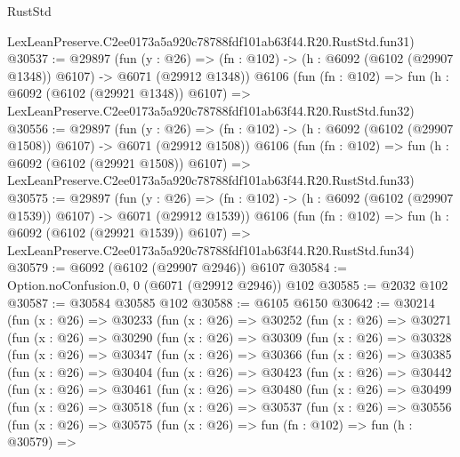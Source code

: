 \begin{lexlean}{RustStd}
\begin{coremodule}
    LexLeanPreserve.C2ee0173a5a920c78788fdf101ab63f44.R20.RustStd.fun31)
@30537 := @29897
    (fun (y : @26) =>
    (fn : @102) -> (h : @6092 (@6102 (@29907 @1348)) @6107) -> @6071 (@29912 @1348))
    @6106
    (fun (fn : @102) =>
    fun (h : @6092 (@6102 (@29921 @1348)) @6107) =>
    LexLeanPreserve.C2ee0173a5a920c78788fdf101ab63f44.R20.RustStd.fun32)
@30556 := @29897
    (fun (y : @26) =>
    (fn : @102) -> (h : @6092 (@6102 (@29907 @1508)) @6107) -> @6071 (@29912 @1508))
    @6106
    (fun (fn : @102) =>
    fun (h : @6092 (@6102 (@29921 @1508)) @6107) =>
    LexLeanPreserve.C2ee0173a5a920c78788fdf101ab63f44.R20.RustStd.fun33)
@30575 := @29897
    (fun (y : @26) =>
    (fn : @102) -> (h : @6092 (@6102 (@29907 @1539)) @6107) -> @6071 (@29912 @1539))
    @6106
    (fun (fn : @102) =>
    fun (h : @6092 (@6102 (@29921 @1539)) @6107) =>
    LexLeanPreserve.C2ee0173a5a920c78788fdf101ab63f44.R20.RustStd.fun34)
@30579 := @6092 (@6102 (@29907 @2946)) @6107
@30584 := Option.noConfusion.{0, 0} (@6071 (@29912 @2946)) @102
@30585 := @2032 @102
@30587 := @30584 @30585 @102
@30588 := @6105 @6150
@30642 := @30214
    (fun (x : @26) =>
    @30233
      (fun (x : @26) =>
      @30252
        (fun (x : @26) =>
        @30271
          (fun (x : @26) =>
          @30290
            (fun (x : @26) =>
            @30309
              (fun (x : @26) =>
              @30328
                (fun (x : @26) =>
                @30347
                  (fun (x : @26) =>
                  @30366
                    (fun (x : @26) =>
                    @30385
                      (fun (x : @26) =>
                      @30404
                        (fun (x : @26) =>
                        @30423
                          (fun (x : @26) =>
                          @30442
                            (fun (x : @26) =>
                            @30461
                              (fun (x : @26) =>
                              @30480
                                (fun (x : @26) =>
                                @30499
                                  (fun (x : @26) =>
                                  @30518
                                    (fun (x : @26) =>
                                    @30537
                                      (fun (x : @26) =>
                                      @30556
                                        (fun (x : @26) =>
                                        @30575
                                          (fun (x : @26) =>
                                          fun (fn : @102) =>
                                          fun (h : @30579) =>

\end{coremodule}
\end{lexlean}
